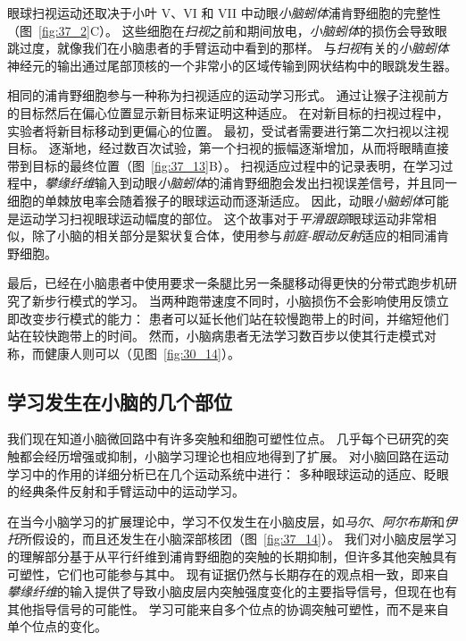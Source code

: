 眼球扫视运动还取决于小叶 V、VI 和 VII 中动眼\textit{小脑蚓体}浦肯野细胞的完整性（图~\ref{fig:37_2}C）。
这些细胞在\textit{扫视}之前和期间放电，\textit{小脑蚓体}的损伤会导致眼跳过度，就像我们在小脑患者的手臂运动中看到的那样。
与\textit{扫视}有关的\textit{小脑蚓体}神经元的输出通过尾部顶核的一个非常小的区域传输到网状结构中的眼跳发生器。


相同的浦肯野细胞参与一种称为扫视适应的运动学习形式。
通过让猴子注视前方的目标然后在偏心位置显示新目标来证明这种适应。
在对新目标的扫视过程中，实验者将新目标移动到更偏心的位置。
最初，受试者需要进行第二次扫视以注视目标。
逐渐地，经过数百次试验，第一个扫视的振幅逐渐增加，从而将眼睛直接带到目标的最终位置（图~\ref{fig:37_13}B）。
扫视适应过程中的记录表明，在学习过程中，\textit{攀缘纤维}输入到动眼\textit{小脑蚓体}的浦肯野细胞会发出扫视误差信号，并且同一细胞的单棘放电率会随着猴子的眼球运动而逐渐适应。
因此，动眼\textit{小脑蚓体}可能是运动学习扫视眼球运动幅度的部位。
这个故事对于\textit{平滑跟踪}眼球运动非常相似，除了小脑的相关部分是絮状复合体，使用参与\textit{前庭-眼动反射}适应的相同浦肯野细胞。


最后，已经在小脑患者中使用要求一条腿比另一条腿移动得更快的分带式跑步机研究了新步行模式的学习。
当两种跑带速度不同时，小脑损伤不会影响使用反馈立即改变步行模式的能力：
患者可以延长他们站在较慢跑带上的时间，并缩短他们站在较快跑带上的时间。
然而，小脑病患者无法学习数百步以使其行走模式对称，而健康人则可以（见图~\ref{fig:30_14}）。



\subsection{学习发生在小脑的几个部位}

我们现在知道小脑微回路中有许多突触和细胞可塑性位点。
几乎每个已研究的突触都会经历增强或抑制，小脑学习理论也相应地得到了扩展。
对小脑回路在运动学习中的作用的详细分析已在几个运动系统中进行：
多种眼球运动的适应、眨眼的经典条件反射和手臂运动中的运动学习。


在当今小脑学习的扩展理论中，学习不仅发生在小脑皮层，如\textit{马尔}、\textit{阿尔布斯}和\textit{伊托}所假设的，而且还发生在小脑深部核团（图~\ref{fig:37_14}）。
我们对小脑皮层学习的理解部分基于从平行纤维到浦肯野细胞的突触的长期抑制，但许多其他突触具有可塑性，它们也可能参与其中。
现有证据仍然与长期存在的观点相一致，即来自\textit{攀缘纤维}的输入提供了导致小脑皮层内突触强度变化的主要指导信号，但现在也有其他指导信号的可能性。
学习可能来自多个位点的协调突触可塑性，而不是来自单个位点的变化。


